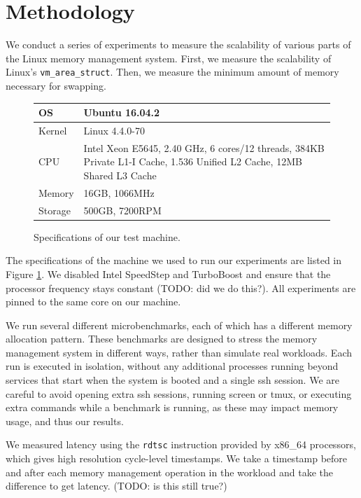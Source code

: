 \documentclass[twocolumn,11pt]{article}
\begin{document}
\section{Methodology}

We conduct a series of experiments to measure the scalability of various parts
of the Linux memory management system.  First, we measure the scalability of
Linux's \texttt{vm\_area\_struct}. Then, we measure the minimum amount of memory
necessary for swapping.

\begin{figure}
\centering
\begin{tabular}{|l|p{5cm}|} \hline
OS & Ubuntu 16.04.2 \\ \hline
Kernel & Linux 4.4.0-70 \\ \hline
CPU & Intel Xeon E5645, 2.40 GHz, 6 cores/12 threads, 384KB Private L1-I Cache,
1.536 Unified L2 Cache, 12MB Shared L3 Cache \\ \hline
Memory & 16GB, 1066MHz \\ \hline
Storage & 500GB, 7200RPM \\
\hline
\end{tabular}
\caption{Specifications of our test machine.  \label{fig:specs}}
\end{figure}

The specifications of the machine we used to run our experiments are listed in
Figure \ref{fig:specs}. We disabled Intel SpeedStep and TurboBoost and ensure
that the processor frequency stays constant (TODO: did we do this?). All
experiments are pinned to the same core on our machine. 

We run several different microbenchmarks, each of which has a different memory
allocation pattern. These benchmarks are designed to stress the memory
management system in different ways, rather than simulate real workloads. 
Each run is executed in isolation, without any additional processes
running beyond services that start when the system is booted and a single ssh
session. We are careful to avoid opening extra ssh sessions, running screen or
tmux, or executing extra commands while a benchmark is running, as these may
impact memory usage, and thus our results.

We measured latency using the \texttt{rdtsc} instruction provided by x86\_64
processors, which gives high resolution cycle-level timestamps. We take a
timestamp before and after each memory management operation in the workload and
take the difference to get latency. (TODO: is this still true?)
\end{document}
